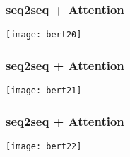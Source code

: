 \begin{frame}[fragile]\frametitle{seq2seq + Attention}





\begin{center}
\texttt{[image: bert20]}
\end{center}	

\end{frame}

\begin{frame}[fragile]\frametitle{seq2seq + Attention}





\begin{center}
\texttt{[image: bert21]}
\end{center}	

\end{frame}

\begin{frame}[fragile]\frametitle{seq2seq + Attention}





\begin{center}
\texttt{[image: bert22]}
\end{center}	

\end{frame}

